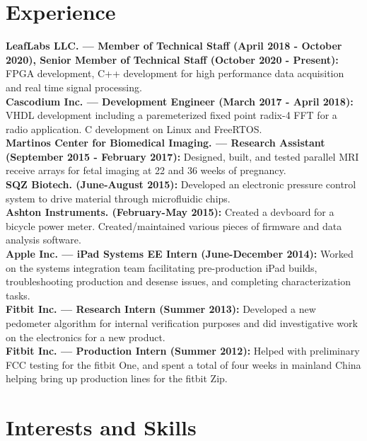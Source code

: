 \documentclass{res}
\begin{document}
\begin{resume}
\section{Experience}
	\vspace{0.05in}
	{\bf LeafLabs LLC. --- Member of Technical Staff (April 2018 - October 2020), Senior Member of Technical Staff (October 2020 - Present):} \vspace{0.05in} FPGA development, C++ development for high performance data acquisition and real time signal processing.\\
	{\bf Cascodium Inc. --- Development Engineer (March 2017 - April 2018):} VHDL development including a paremeterized fixed point radix-4 FFT for a radio application. C development on Linux and FreeRTOS.   \vspace{0.05in}\\
	{\bf Martinos Center for Biomedical Imaging. --- Research Assistant (September 2015 - February 2017):} Designed, built, and tested parallel MRI receive arrays for fetal imaging at 22 and 36 weeks of pregnancy. \vspace{0.05in}\\
	{\bf SQZ Biotech. (June-August 2015):} Developed an electronic pressure control system to drive material through microfluidic chips. \vspace{0.05in}\\
	{\bf Ashton Instruments. (February-May 2015):} Created a devboard for a bicycle power meter.  Created/maintained various pieces of firmware and data analysis software. \vspace{0.05in}\\
	{\bf Apple Inc. --- iPad Systems EE Intern (June-December 2014):} Worked on the systems integration team facilitating pre-production iPad builds, troubleshooting production and desense issues, and completing characterization tasks.\vspace{0.05in}\\
	{\bf Fitbit Inc. --- Research Intern (Summer 2013):} Developed a new pedometer algorithm for internal verification purposes and did investigative work on the electronics for a new product.\vspace{0.05in}\\
	{\bf Fitbit Inc. --- Production Intern (Summer 2012):} Helped with preliminary FCC testing for the fitbit One, and spent a total of four weeks in mainland China helping bring up production lines for the fitbit Zip.\\
\section{Interests and Skills}
\begin{itemize}


\end{itemize}
\end{resume}
\end{document}
